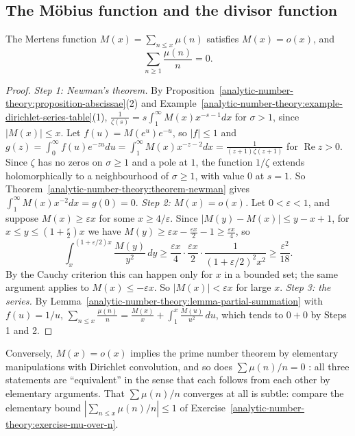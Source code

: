 \subsection{The M\"obius function and the divisor function}\label{analytic-number-theory:subsection-mobius-pnt}

\begin{theorem}\label{analytic-number-theory:theorem-mertens-function}
The Mertens function $M(x) = \sum_{n \leq x}\mu(n)$ satisfies $M(x) = o(x)$, and
\[
\sum_{n \geq 1}\frac{\mu(n)}{n} = 0.
\]
\end{theorem}

\begin{proof}
\emph{Step 1: Newman's theorem.} By Proposition~\ref{analytic-number-theory:proposition-abscissae}(2) and Example~\ref{analytic-number-theory:example-dirichlet-series-table}(1),
$\frac{1}{\zeta(s)} = s\int_1^\infty M(x)x^{-s-1}dx$ for $\sigma > 1$, since $|M(x)| \leq x$. Let $f(u) = M(e^u)e^{-u}$, so $|f| \leq 1$ and
$g(z) = \int_0^\infty f(u)e^{-zu}du = \int_1^\infty M(x)x^{-z-2}dx = \frac{1}{(z + 1)\zeta(z + 1)}$ for $\operatorname{Re}z > 0$. Since $\zeta$ has no zeros on $\sigma \geq 1$ and a pole at $1$, the function
$1/\zeta$ extends holomorphically to a neighbourhood of $\sigma \geq 1$, with value $0$ at $s = 1$. So Theorem~\ref{analytic-number-theory:theorem-newman} gives $\int_1^\infty M(x)x^{-2}dx = g(0) = 0$.
\emph{Step 2: $M(x) = o(x)$.} Let $0 < \varepsilon < 1$, and suppose $M(x) \geq \varepsilon x$ for some $x \geq 4/\varepsilon$. Since $|M(y) - M(x)| \leq y - x + 1$, for $x \leq y \leq (1 + \frac\varepsilon2)x$
we have $M(y) \geq \varepsilon x - \frac{\varepsilon x}{2} - 1 \geq \frac{\varepsilon x}{4}$, so
\[
\int_x^{(1 + \varepsilon/2)x}\frac{M(y)}{y^2}\,dy \geq \frac{\varepsilon x}{4}\cdot\frac{\varepsilon x}{2}\cdot\frac{1}{(1 + \varepsilon/2)^2x^2} \geq \frac{\varepsilon^2}{18}.
\]
By the Cauchy criterion this can happen only for $x$ in a bounded set; the same argument applies to $M(x) \leq -\varepsilon x$. So $|M(x)| < \varepsilon x$ for large $x$.
\emph{Step 3: the series.} By Lemma~\ref{analytic-number-theory:lemma-partial-summation} with $f(u) = 1/u$, $\sum_{n \leq x}\frac{\mu(n)}{n} = \frac{M(x)}{x} + \int_1^x\frac{M(u)}{u^2}\,du$, which tends to
$0 + 0$ by Steps 1 and 2.
\end{proof}

\begin{remark}\label{analytic-number-theory:remark-mertens-pnt}
Conversely, $M(x) = o(x)$ implies the prime number theorem by elementary manipulations with Dirichlet convolution, and so does $\sum\mu(n)/n = 0$ \cite{apostol-analytic}: all three statements are
``equivalent'' in the sense that each follows from each other by elementary arguments. That $\sum\mu(n)/n$ converges at all is subtle: compare the elementary bound $|\sum_{n \leq x}\mu(n)/n| \leq 1$ of
Exercise~\ref{analytic-number-theory:exercise-mu-over-n}.
\end{remark}

